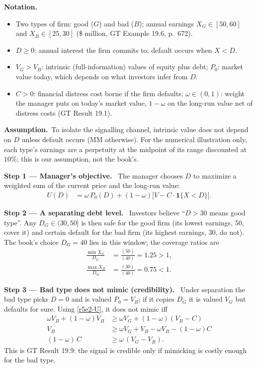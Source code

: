\documentclass[11pt,a4paper]{article}
\newcommand{\notation}{\par\noindent\textbf{Notation.}}
\newcommand{\step}[2]{\par\medskip\noindent\textbf{Step #1 --- #2.}~}
\newcommand{\assume}{\par\smallskip\noindent\textbf{Assumption.}~}
\begin{document}
\notation
\begin{itemize}
  \item Two types of firm: good ($G$) and bad ($B$); annual earnings $X_G\in[50,60]$ and $X_B\in[25,30]$ (\$ million, GT Example 19.6, p.~672).
  \item $D\ge 0$: annual interest the firm commits to; default occurs when $X<D$.
  \item $V_G>V_B$: intrinsic (full-information) values of equity plus debt; $P_0$: market value today, which depends on what investors infer from $D$.
  \item $C>0$: financial distress cost borne if the firm defaults; $\omega\in(0,1)$: weight the manager puts on today's market value, $1-\omega$ on the long-run value net of distress costs (GT Result 19.1).
\end{itemize}

\assume To isolate the signalling channel, intrinsic value does not depend on $D$ unless default occurs (MM otherwise). For the numerical illustration only, each type's earnings are a perpetuity at the midpoint of its range discounted at $10\%$; this is our assumption, not the book's.

\step{1}{Manager's objective} The manager chooses $D$ to maximize a weighted sum of the current price and the long-run value:
\begin{align}
  U(D) &= \omega\,P_0(D) + (1-\omega)\bigl[V - C\cdot\mathbf 1\{X<D\}\bigr]. \label{r5e2-U}
\end{align}

\step{2}{A separating debt level} Investors believe ``$D>30$ means good type''. Any $D_G\in(30,50]$ is then safe for the good firm (its lowest earnings, 50, cover it) and certain default for the bad firm (its highest earnings, 30, do not). The book's choice $D_G=40$ lies in this window; the coverage ratios are
\begin{align}
  \frac{\min X_G}{D_G} &= \frac{(50)}{(40)} = 1.25 > 1, \nonumber\\
  \frac{\max X_B}{D_G} &= \frac{(30)}{(40)} = 0.75 < 1. \nonumber
\end{align}

\step{3}{Bad type does not mimic (credibility)} Under separation the bad type picks $D=0$ and is valued $P_0=V_B$; if it copies $D_G$ it is valued $V_G$ but defaults for sure. Using \eqref{r5e2-U}, it does not mimic iff
\begin{align}
  \omega V_B + (1-\omega)V_B &\ge \omega V_G + (1-\omega)(V_B - C) \nonumber\\
  V_B &\ge \omega V_G + V_B - \omega V_B - (1-\omega)C \nonumber\\
  (1-\omega)\,C &\ge \omega\,(V_G - V_B). \label{r5e2-cred}
\end{align}
This is GT Result 19.9: the signal is credible only if mimicking is costly enough for the bad type.
\end{document}
